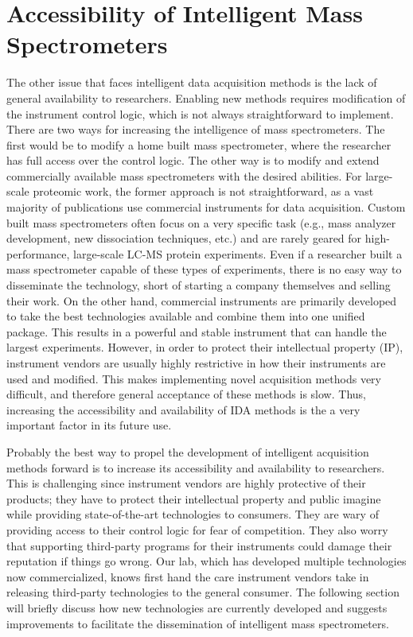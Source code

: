 \section{Accessibility of Intelligent Mass Spectrometers}
The other issue that faces intelligent data acquisition methods is the lack of general availability to researchers. Enabling new methods requires modification of the instrument control logic, which is not always straightforward to implement. There are two ways for increasing the intelligence of mass spectrometers. The first would be to modify a home built mass spectrometer, where the researcher has full access over the control logic. The other way is to modify and extend commercially available mass spectrometers with the desired abilities. For large-scale proteomic work, the former approach is not straightforward, as a vast majority of publications use commercial instruments for data acquisition. Custom built mass spectrometers often focus on a very specific task (e.g., mass analyzer development, new dissociation techniques, etc.) and are rarely geared for high-performance, large-scale LC-MS protein experiments. Even if a researcher built a mass spectrometer capable of these types of experiments, there is no easy way to disseminate the technology, short of starting a company themselves and selling their work. On the other hand, commercial instruments are primarily developed to take the best technologies available and combine them into one unified package. This results in a powerful and stable instrument that can handle the largest experiments. However, in order to protect their intellectual property (IP), instrument vendors are usually highly restrictive in how their instruments are used and modified. This makes implementing novel acquisition methods very difficult, and therefore general acceptance of these methods is slow. Thus, increasing the accessibility and availability of IDA methods is the a very important factor in its future use.

Probably the best way to propel the development of intelligent acquisition methods forward is to increase its accessibility and availability to researchers. This is challenging since instrument vendors are highly protective of their products; they have to protect their intellectual property and public imagine while providing state-of-the-art technologies to consumers. They are wary of providing access to their control logic for fear of competition. They also worry that supporting third-party programs for their instruments could damage their reputation if things go wrong. Our lab, which has developed multiple technologies now commercialized, knows first hand the care instrument vendors take in releasing third-party technologies to the general consumer. The following section will briefly discuss how new technologies are currently developed and suggests improvements to facilitate the dissemination of intelligent mass spectrometers.  

